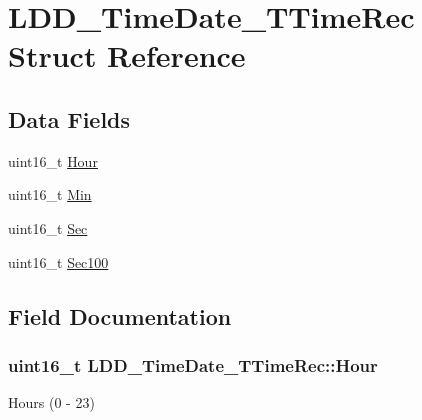 \hypertarget{struct_l_d_d___time_date___t_time_rec}{}\section{L\+D\+D\+\_\+\+Time\+Date\+\_\+\+T\+Time\+Rec Struct Reference}
\label{struct_l_d_d___time_date___t_time_rec}
\subsection*{Data Fields}
\begin{DoxyCompactItemize}
\item 
uint16\+\_\+t \hyperlink{struct_l_d_d___time_date___t_time_rec_ac741c5c14148b2d360bb09fedc6ebabd}{Hour}
\item 
uint16\+\_\+t \hyperlink{struct_l_d_d___time_date___t_time_rec_a7cea2c409e90bccdc33f19b093020373}{Min}
\item 
uint16\+\_\+t \hyperlink{struct_l_d_d___time_date___t_time_rec_a05cccc86e89e5704b0460caaf2429f75}{Sec}
\item 
uint16\+\_\+t \hyperlink{struct_l_d_d___time_date___t_time_rec_a2cd2e13e7c478f04ea1c4c460b104491}{Sec100}
\end{DoxyCompactItemize}


\subsection{Field Documentation}
\hypertarget{struct_l_d_d___time_date___t_time_rec_ac741c5c14148b2d360bb09fedc6ebabd}{}
\subsubsection[{Hour}]{\setlength{\rightskip}{0pt plus 5cm}uint16\+\_\+t L\+D\+D\+\_\+\+Time\+Date\+\_\+\+T\+Time\+Rec\+::\+Hour}\label{struct_l_d_d___time_date___t_time_rec_ac741c5c14148b2d360bb09fedc6ebabd}
Hours (0 -\/ 23) \hypertarget{struct_l_d_d___time_date___t_time_rec_a7cea2c409e90bccdc33f19b093020373}{}
